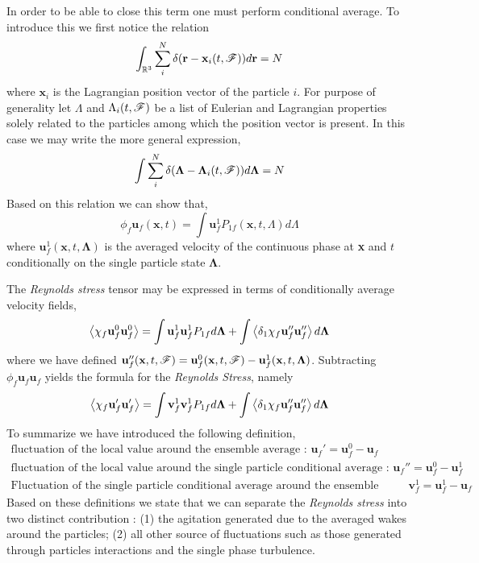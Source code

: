 In order to be able to close this term one must perform conditional average. 
To introduce this we first notice the relation 
\begin{equation}
    \int_{\mathbb{R}^3}
    \sum_i^N \delta(\textbf{r}-\textbf{x}_i(t,\mathscr{F}))
    d\textbf{r}
    = N 
\end{equation}
where $\textbf{x}_i$ is the Lagrangian position vector of the particle $i$. 
For purpose of generality let $\Lambda$ and $\Lambda_i(t,\mathscr{F})$ be a list of Eulerian and Lagrangian properties solely related to the particles among which the position vector is present. 
In this case we may write the more general expression, 
\begin{equation}
    \int
    \sum_i^N \delta(\bm\Lambda-\bm\Lambda_i(t,\mathscr{F}))
    d\bm\Lambda
    = N 
\end{equation}
Based on this relation we can show that, 
\begin{equation}
    \phi_f \textbf{u}_f(\textbf{x},t)
    = 
    \int 
    \textbf{u}^1_f 
    P_{1f}(\textbf{x},t,\Lambda)
    d\Lambda
\end{equation}
where $\textbf{u}^1_f(\textbf{x},t,\bm\Lambda)$ is the averaged velocity of the continuous phase at \textbf{x} and $t$ conditionally on the single particle state $\bm\Lambda$. 

The \textit{Reynolds stress} tensor may be expressed in terms of conditionally average velocity fields, 
\begin{equation}
    \left<\chi_f\textbf{u}_f^0 \textbf{u}_f^0\right>
    = 
    \int \textbf{u}_f^1\textbf{u}_f^1 P_{1f} d\bm\Lambda
    + 
    \int \left<\delta_1 \chi_f\textbf{u}_f'' \textbf{u}_f''\right> d\bm\Lambda
\end{equation}
where we have defined $\textbf{u}_f''(\textbf{x},t,\mathscr{F}) = \textbf{u}^0_f(\textbf{x},t,\mathscr{F}) -\textbf{u}^1_f(\textbf{x},t,\bm\Lambda)$. 
Subtracting $\phi_f \textbf{u}_f\textbf{u}_f$ yields the formula for the \textit{Reynolds Stress}, namely 
\begin{equation}
    \avg{\chi_f\textbf{u}_f' \textbf{u}_f'}
    = 
    \int \textbf{v}_f^1\textbf{v}_f^1 P_{1f} d\bm\Lambda
    + 
    \int \avg{\delta_1 \chi_f\textbf{u}_f'' \textbf{u}_f''} d\bm\Lambda
    \label{eq:Re}
\end{equation}
To summarize we have introduced the following definition, 
\begin{align*}
    \text{fluctuation of the local value around the ensemble average : }\textbf{u}_f' = \textbf{u}_f^0 - \textbf{u}_f\\
    \text{fluctuation of the local value around the single particle conditional average : }\textbf{u}_f'' = \textbf{u}_f^0 - \textbf{u}_f^1\\
    \text{Fluctuation of the single particle conditional average around the ensemble average : }\textbf{v}_f^1 = \textbf{u}_f^1 - \textbf{u}_f
\end{align*}
Based on these definitions we state that we can separate the \textit{Reynolds stress} into two distinct contribution :  (1) the agitation generated due to the averaged wakes around the particles; (2) all other source of fluctuations such as those generated through particles interactions and the single phase turbulence. 

